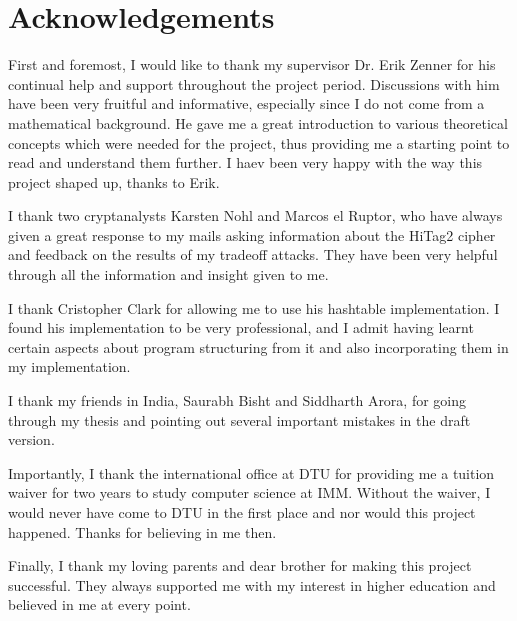 
\chapter*{Acknowledgements}

First and foremost, I would like to thank my supervisor Dr. Erik Zenner for his continual help and support throughout the project period. Discussions with him have been very fruitful and informative, especially since I do not come from a mathematical background. He gave me a great introduction to various theoretical concepts which were needed for the project, thus providing me a starting point to read and understand them further. I haev been very happy with the way this project shaped up, thanks to Erik. 

I thank two cryptanalysts Karsten Nohl and Marcos el Ruptor, who have always given a great response to my mails asking information about the HiTag2 cipher and feedback on the results of my tradeoff attacks. They have been very helpful through all the information and insight given to me. 

I thank Cristopher Clark for allowing me to use his hashtable implementation. I found his implementation to be very professional, and I admit having learnt certain aspects about program structuring from it and also incorporating them in my implementation. 

I thank my friends in India, Saurabh Bisht and Siddharth Arora, for going through my thesis and pointing out several important mistakes in the draft version.

Importantly, I thank the international office at DTU for providing me a tuition waiver for two years to study computer science at IMM. Without the waiver, I would never have come to DTU in the first place and nor would this project happened. Thanks for believing in me then.

Finally, I thank my loving parents and dear brother for making this project successful. They always supported me with my interest in higher education and believed in me at every point. 